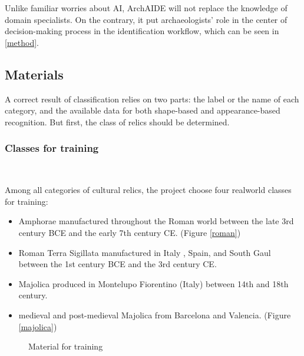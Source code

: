 \documentclass[journal]{IEEEtran}
\begin{document}
	Unlike familiar worries about AI, ArchAIDE will not replace the knowledge of domain specialists. On the contrary, it put archaeologists' role in the center of decision-making process in the identification workflow, which can be seen in \ref{method}.
	
	\subsection{Materials}
	
	A correct result of classification relies on two parts: the label or the name of each category, and the available data for both shape-based and appearance-based recognition. But first, the class of relics should be determined.
	
	\subsubsection{Classes for training}
	\ 
	
	Among all categories of cultural relics, the project choose four realworld classes for training:
	
	\begin{itemize}
		\item Amphorae manufactured throughout the Roman world between the late 3rd century BCE and the early 7th century CE. (Figure \ref{roman})
		\item Roman Terra Sigillata manufactured in Italy , Spain, and South Gaul between the 1st century BCE and the 3rd century CE.
		\item Majolica produced in Montelupo Fiorentino (Italy) between 14th and 18th century.
		\item medieval and post-medieval Majolica from Barcelona and Valencia. (Figure \ref{majolica})
	\end{itemize}
	
	\begin{figure}[htbp]%
		\centering
		\hfill
		\caption{Material for training}
		\label{2figs}
	\end{figure}
\end{document}
